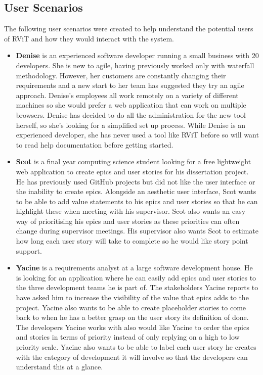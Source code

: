 \documentclass[l4proj.tex]{subfiles}
\begin{document}
\subsection{User Scenarios}
The following user scenarios were created to help understand the potential users of RViT and how they would interact with the system.
\begin{itemize}
    \item \textbf{Denise} is an experienced software developer running a small business with 20 developers. She is new to agile, having previously worked only with waterfall methodology. However, her customers are constantly changing their requirements and a new start to her team has suggested they try an agile approach. Denise's employees all work remotely on a variety of different machines so she would prefer a web application that can work on multiple browsers. Denise has decided to do all the administration for the new tool herself, so she's looking for a simplified set up process. While Denise is an experienced developer, she has never used a tool like RViT before so will want to read help documentation before getting started.\\
    
    \item  \textbf{Scot} is a final year computing science student looking for a free lightweight web application to create epics and user stories for his dissertation project. He has previously used GitHub projects but did not like the user interface or the inability to create epics. Alongside an aesthetic user interface, Scot wants to be able to add value statements to his epics and user stories so that he can highlight these when meeting with his supervisor. Scot also wants an easy way of prioritising his epics and user stories as these priorities can often change during supervisor meetings. His supervisor also wants Scot to estimate how long each user story will take to complete so he would like story point support.\\

    \item \textbf{Yacine} is a requirements analyst at a large software development house. He is looking for an application where he can easily add epics and user stories to the three development teams he is part of. The stakeholders Yacine reports to have asked him to increase the visibility of the value that epics adds to the project. Yacine also wants to be able to create placeholder stories to come back to when he has a better grasp on the user story its definition of done. The developers Yacine works with also would like Yacine to order the epics and stories in terms of priority instead of only replying on a high to low priority scale. Yacine also wants to be able to label each user story he creates with the category of development it will involve so that the developers can understand this at a glance. \\


\end{itemize}
\end{document}
